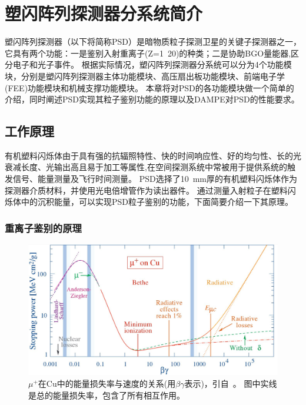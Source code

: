 \chapter{塑闪阵列探测器分系统简介}
塑闪阵列探测器（以下将简称PSD）是暗物质粒子探测卫星的关键子探测器之一，它具有两个功能：一是鉴别入射重离子(Z=1~20)的种类；二是协助BGO量能器,区分电子和光子事件。
根据实际情况，塑闪阵列探测器分系统可以分为4个功能模块，分别是塑闪阵列探测器主体功能模块、高压扇出板功能模块、前端电子学(FEE)功能模块和机械支撑功能模块。
本章将对PSD的各功能模块做一个简单的介绍，同时阐述PSD实现其粒子鉴别功能的原理以及DAMPE对PSD的性能要求。

\section{工作原理}
\label{sec:psd_principle}
有机塑料闪烁体由于具有强的抗辐照特性、快的时间响应性、好的均匀性、长的光衰减长度、光输出高且易于加工等属性,在空间探测系统中常被用于提供系统的触发信号、能量测量及飞行时间测量。
PSD选择了\SI{10}{\milli\meter}厚的有机塑料闪烁体作为探测器介质材料，并使用光电倍增管作为读出器件。
通过测量入射粒子在塑料闪烁体中的沉积能量，可以实现PSD粒子鉴别的功能，下面简要介绍一下其原理。

\subsection{重离子鉴别的原理}
\begin{figure}[h!]
	\centering
	\includegraphics[width=0.8\linewidth]{chap/description/fig/energyloss_vs_velocity}
	\caption{${\mu}^+$在Cu中的能量损失率与速度的关系(用$\beta\gamma$表示)，引自~\parencite{pdg_book}。 图中实线是总的能量损失率，包含了所有相互作用。}
	\label{fig:ch2:energyloss_vs_velocity}
\end{figure}

